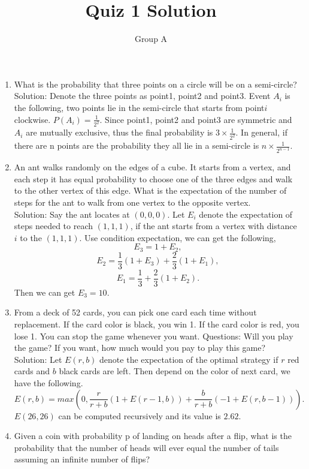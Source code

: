 \documentclass[10pt, onecolumn, draftcls]{IEEEtran}
\begin{document}
\title{Quiz 1 Solution}
\author{Group A}
\maketitle

\begin{enumerate}
\item
What is the probability that three points on a circle will be on a semi-circle?\\
{\color{red} Solution}: Denote the three points as point1, point2 and point3. Event $A_i$ is the following, two points lie in the semi-circle that starts from point$i$ clockwise. $P(A_i)=\frac{1}{2^{2}}$. Since point1, point2 and point3 are symmetric and $A_i$ are mutually exclusive, thus the final probability is $3\times \frac{1}{2^{2}}$.
In general, if there are n points are the probability they all lie in a semi-circle is $n \times \frac{1}{2^{n-1}}$.
\item
An ant walks randomly on the edges of a cube. It starts from a vertex, and each step it has equal probability to choose one of the three edges and walk to the other vertex of this edge. What is the expectation of the number of steps for the ant to walk from one vertex to the opposite vertex.\\
{\color{red} Solution}: Say the ant locates at $(0,0,0)$. Let $E_i$ denote the expectation of steps needed to reach $(1,1,1)$, if the ant starts from a vertex with distance $i$ to the $(1,1,1)$. Use condition expectation, we can get the following,
$$E_3=1+E_2,$$
$$E_2=\frac{1}{3}(1+E_3)+\frac{2}{3}(1+E_1),$$
$$E_1=\frac{1}{3}+\frac{2}{3}(1+E_2).$$
Then we can get $E_3=10.$
\item
From a deck of 52 cards, you can pick one card each time without replacement. If the card color is black, you win 1. If the card color is red, you lose 1. You can stop the game whenever you want. Questions: Will you play the game? If you want, how much would you pay to play this game?\\
{\color{red} Solution}: Let $E(r, b)$ denote the expectation of the optimal strategy if $r$ red cards and $b$ black cards are left. Then depend on the color of next card, we have the following. 
$$E(r, b)=max(0, \frac{r}{r+b}(1+E(r-1, b))+\frac{b}{r+b}(-1+E(r, b-1))).$$
$E(26,26)$ can be computed recursively and its value is $2.62$. 
\item
Given a coin with probability p of landing on heads after a flip, what is the probability that the number of heads will ever equal the number of tails assuming an infinite number of flips?\\

\end{enumerate}
\end{document}

